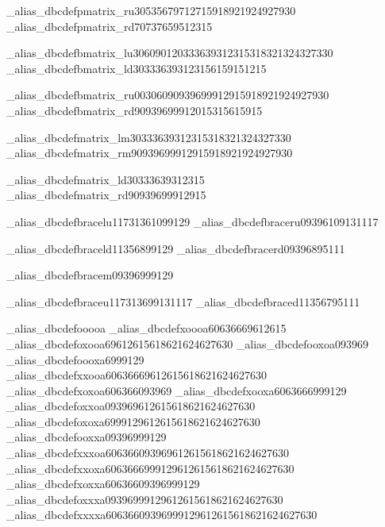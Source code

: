 \brl@char_alias_dbcdef{pmatrix_ru}{{3}{0}{5}{3}{5}{6}{7}{9}{7}{12}{7}{15}{9}{18}{9}{21}{9}{24}{9}{27}{9}{30}}
\brl@char_alias_dbcdef{pmatrix_rd}{{7}{0}{7}{3}{7}{6}{5}{9}{5}{12}{3}{15}}

\brl@char_alias_dbcdef{bmatrix_lu}{{3}{0}{6}{0}{9}{0}{12}{0}{3}{3}{3}{6}{3}{9}{3}{12}{3}{15}{3}{18}{3}{21}{3}{24}{3}{27}{3}{30}}
\brl@char_alias_dbcdef{bmatrix_ld}{{3}{0}{3}{3}{3}{6}{3}{9}{3}{12}{3}{15}{6}{15}{9}{15}{12}{15}}

\brl@char_alias_dbcdef{bmatrix_ru}{{0}{0}{3}{0}{6}{0}{9}{0}{9}{3}{9}{6}{9}{9}{9}{12}{9}{15}{9}{18}{9}{21}{9}{24}{9}{27}{9}{30}}
\brl@char_alias_dbcdef{bmatrix_rd}{{9}{0}{9}{3}{9}{6}{9}{9}{9}{12}{0}{15}{3}{15}{6}{15}{9}{15}}

\brl@char_alias_dbcdef{matrix_lm}{{3}{0}{3}{3}{3}{6}{3}{9}{3}{12}{3}{15}{3}{18}{3}{21}{3}{24}{3}{27}{3}{30}}
\brl@char_alias_dbcdef{matrix_rm}{{9}{0}{9}{3}{9}{6}{9}{9}{9}{12}{9}{15}{9}{18}{9}{21}{9}{24}{9}{27}{9}{30}}

\brl@char_alias_dbcdef{matrix_ld}{{3}{0}{3}{3}{3}{6}{3}{9}{3}{12}{3}{15}}
\brl@char_alias_dbcdef{matrix_rd}{{9}{0}{9}{3}{9}{6}{9}{9}{9}{12}{9}{15}}




\brl@char_alias_dbcdef{bracelu}{{1}{17}{3}{13}{6}{10}{9}{9}{12}{9}}
\brl@char_alias_dbcdef{braceru}{{0}{9}{3}{9}{6}{10}{9}{13}{11}{17}}

\brl@char_alias_dbcdef{braceld}{{1}{1}{3}{5}{6}{8}{9}{9}{12}{9}}
\brl@char_alias_dbcdef{bracerd}{{0}{9}{3}{9}{6}{8}{9}{5}{11}{1}}

\brl@char_alias_dbcdef{bracem}{{0}{9}{3}{9}{6}{9}{9}{9}{12}{9}}

\brl@char_alias_dbcdef{braceu}{{1}{17}{3}{13}{6}{9}{9}{13}{11}{17}}
\brl@char_alias_dbcdef{braced}{{1}{1}{3}{5}{6}{7}{9}{5}{11}{1}}


\brl@char_alias_dbcdef{ooooa}{}
\brl@char_alias_dbcdef{xoooa}{{6}{0}{6}{3}{6}{6}{6}{9}{6}{12}{6}{15}}%
\brl@char_alias_dbcdef{oxooa}{{6}{9}{6}{12}{6}{15}{6}{18}{6}{21}{6}{24}{6}{27}{6}{30}}
\brl@char_alias_dbcdef{ooxoa}{{0}{9}{3}{9}{6}{9}}
\brl@char_alias_dbcdef{oooxa}{{6}{9}{9}{9}{12}{9}}
\brl@char_alias_dbcdef{xxooa}{{6}{0}{6}{3}{6}{6}{6}{9}{6}{12}{6}{15}{6}{18}{6}{21}{6}{24}{6}{27}{6}{30}}
\brl@char_alias_dbcdef{xoxoa}{{6}{0}{6}{3}{6}{6}{0}{9}{3}{9}{6}{9}}
\brl@char_alias_dbcdef{xooxa}{{6}{0}{6}{3}{6}{6}{6}{9}{9}{9}{12}{9}}
\brl@char_alias_dbcdef{oxxoa}{{0}{9}{3}{9}{6}{9}{6}{12}{6}{15}{6}{18}{6}{21}{6}{24}{6}{27}{6}{30}}
\brl@char_alias_dbcdef{oxoxa}{{6}{9}{9}{9}{12}{9}{6}{12}{6}{15}{6}{18}{6}{21}{6}{24}{6}{27}{6}{30}}
\brl@char_alias_dbcdef{ooxxa}{{0}{9}{3}{9}{6}{9}{9}{9}{12}{9}}
\brl@char_alias_dbcdef{xxxoa}{{6}{0}{6}{3}{6}{6}{0}{9}{3}{9}{6}{9}{6}{12}{6}{15}{6}{18}{6}{21}{6}{24}{6}{27}{6}{30}}
\brl@char_alias_dbcdef{xxoxa}{{6}{0}{6}{3}{6}{6}{6}{9}{9}{9}{12}{9}{6}{12}{6}{15}{6}{18}{6}{21}{6}{24}{6}{27}{6}{30}}
\brl@char_alias_dbcdef{xoxxa}{{6}{0}{6}{3}{6}{6}{0}{9}{3}{9}{6}{9}{9}{9}{12}{9}}
\brl@char_alias_dbcdef{oxxxa}{{0}{9}{3}{9}{6}{9}{9}{9}{12}{9}{6}{12}{6}{15}{6}{18}{6}{21}{6}{24}{6}{27}{6}{30}}
\brl@char_alias_dbcdef{xxxxa}{{6}{0}{6}{3}{6}{6}{0}{9}{3}{9}{6}{9}{9}{9}{12}{9}{6}{12}{6}{15}{6}{18}{6}{21}{6}{24}{6}{27}{6}{30}}

